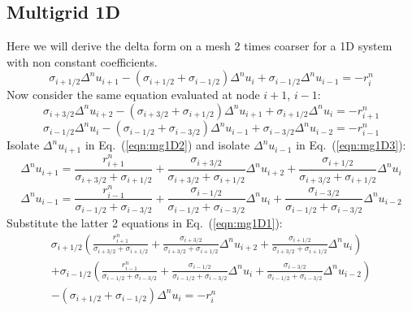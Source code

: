 \documentclass{warpdoc}
\begin{document}
\subsection{Multigrid 1D}

Here we will derive the delta form on a mesh 2 times coarser for a 1D system with non constant coefficients. 
%
\begin{equation}
  \sigma_{i+1/2} \Delta^n u_{i+1} - (\sigma_{i+1/2}+\sigma_{i-1/2}) \Delta^n u_{i} +\sigma_{i-1/2}\Delta^n u_{i-1}
      = -r_{i}^n
\label{eqn:mg1D1}
\end{equation}
%
Now consider the same equation evaluated at node $i+1$, $i-1$:
%
\begin{equation}
  \sigma_{i+3/2} \Delta^n u_{i+2} - (\sigma_{i+3/2}+\sigma_{i+1/2}) \Delta^n u_{i+1} +\sigma_{i+1/2}\Delta^n u_{i}
      = -r_{i+1}^n
\label{eqn:mg1D2}
\end{equation}
%
%
\begin{equation}
  \sigma_{i-1/2} \Delta^n u_{i} - (\sigma_{i-1/2}+\sigma_{i-3/2}) \Delta^n u_{i-1} +\sigma_{i-3/2}\Delta^n u_{i-2}
      = -r_{i-1}^n
\label{eqn:mg1D3}
\end{equation}
%
Isolate $\Delta^n u_{i+1}$ in Eq.\ (\ref{eqn:mg1D2}) and isolate $\Delta^n u_{i-1}$ in Eq.\ (\ref{eqn:mg1D3}):
%
\begin{equation}
     \Delta^n u_{i+1} 
      = \frac{r_{i+1}^n}{\sigma_{i+3/2}+\sigma_{i+1/2}} + \frac{\sigma_{i+3/2}}{\sigma_{i+3/2}+\sigma_{i+1/2}} \Delta^n u_{i+2} + \frac{\sigma_{i+1/2}}{\sigma_{i+3/2}+\sigma_{i+1/2}}\Delta^n u_{i}
\label{eqn:mg1D4}
\end{equation}
%
%
\begin{equation}
     \Delta^n u_{i-1} 
      = \frac{r_{i-1}^n}{\sigma_{i-1/2}+\sigma_{i-3/2}}  + \frac{\sigma_{i-1/2}}{\sigma_{i-1/2}+\sigma_{i-3/2}} \Delta^n u_{i}  + \frac{\sigma_{i-3/2}}{\sigma_{i-1/2}+\sigma_{i-3/2}}\Delta^n u_{i-2}
\label{eqn:mg1D5}
\end{equation}
%
Substitute the latter 2 equations in Eq.\ (\ref{eqn:mg1D1}):
%
\begin{align}
  \sigma_{i+1/2} \left( \frac{r_{i+1}^n}{\sigma_{i+3/2}+\sigma_{i+1/2}} + \frac{\sigma_{i+3/2}}{\sigma_{i+3/2}+\sigma_{i+1/2}} \Delta^n u_{i+2} + \frac{\sigma_{i+1/2}}{\sigma_{i+3/2}+\sigma_{i+1/2}}\Delta^n u_{i}  \right)\nonumber\\
+\sigma_{i-1/2}\left( \frac{r_{i-1}^n}{\sigma_{i-1/2}+\sigma_{i-3/2}}  + \frac{\sigma_{i-1/2}}{\sigma_{i-1/2}+\sigma_{i-3/2}} \Delta^n u_{i}  + \frac{\sigma_{i-3/2}}{\sigma_{i-1/2}+\sigma_{i-3/2}}\Delta^n u_{i-2}\right)\nonumber\\
 - (\sigma_{i+1/2}+\sigma_{i-1/2}) \Delta^n u_{i} 
      = -r_{i}^n
\label{eqn:mg1D6}
\end{align}
\end{document}
